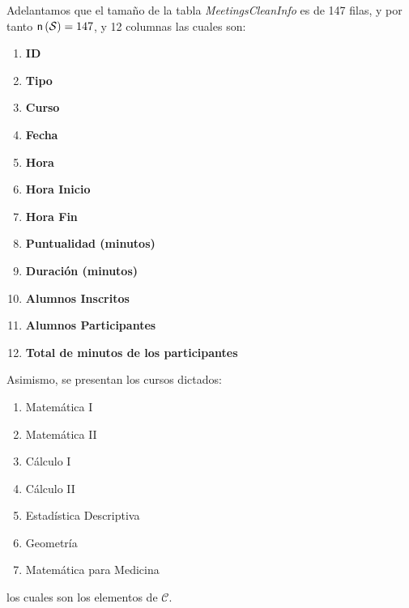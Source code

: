 \documentclass[11pt,a4paper]{book}
\theoremstyle{definition}%
\newcommand{\card}[1]{\text{\textsf{n}}\left( #1 \right)}
\begin{document}
            Adelantamos que el tamaño de la tabla \textit{MeetingsCleanInfo} es de 147 filas, y por tanto $\card{\mathcal{S}}=147$, y 12 columnas las cuales son:
            {   \footnotesize
                \begin{multicols}{3}
                    \begin{enumerate}\label{columnas MeetingsCleanInfo}
                        \item \textbf{ID}
                        \item \textbf{Tipo}
                        \item \textbf{Curso}
                        \item \textbf{Fecha}
                        \item \textbf{Hora}
                        \item \textbf{Hora Inicio}
                        \item \textbf{Hora Fin}
                        \item \textbf{Puntualidad (minutos)}
                        \item \textbf{Duración (minutos)}
                        \item \textbf{Alumnos Inscritos}
                        \item \textbf{Alumnos Participantes}
                        \item \textbf{Total de minutos de los participantes}
                    \end{enumerate}
                \end{multicols}
            }
            Asimismo, se presentan los cursos dictados:
            {   \footnotesize
                \begin{multicols}{4}
                    \begin{enumerate}\label{cursos dictados}
                        \item Matemática I
                        \item Matemática II
                        \item Cálculo I
                        \item Cálculo II
                        \item Estadística Descriptiva
                        \item Geometría
                        \item Matemática para Medicina
                    \end{enumerate}
                \end{multicols}
            }
            los cuales son los elementos de $\mathcal{C}$.
\end{document}
